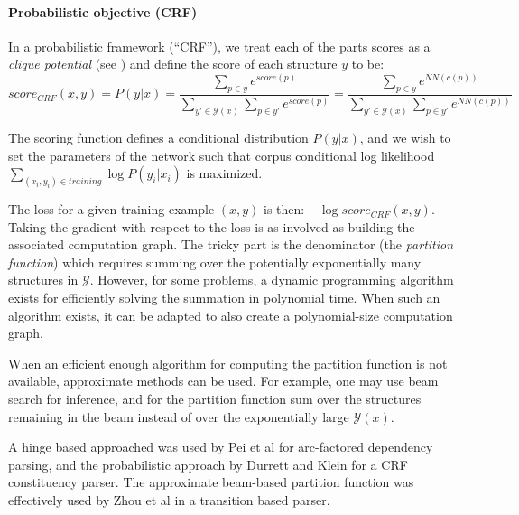 \documentclass[jair,twoside,11pt,theapa]{article}
\renewcommand{\shortcite}[0]{\citeyear}
\begin{document}
{\paragraph{Probabilistic objective (CRF)}

In a probabilistic framework (``CRF''), we treat each of the parts scores as a
\emph{clique potential} (see \cite{smith2011linguistic}) and define the score of each structure $y$ to be:
\[
score_{CRF}(x,y) = P(y|x) = \frac{\sum_{p \in y} e^{score(p)}}{\sum_{y' \in \mathcal{Y}(x)}\sum_{p \in y'}e^{score(p)}} = \frac{\sum_{p \in y} e^{NN(c(p))}}{\sum_{y' \in \mathcal{Y}(x)}\sum_{p \in y'}e^{NN(c(p))}} 
\]

The scoring function defines a conditional distribution $P(y|x)$, and we wish to
set the parameters of the network such that corpus conditional log likelihood
$\sum_{(x_i,y_i) \in training}\log P(y_i|x_i)$ is maximized.

The loss for a given training example $(x,y)$ is then: $-\log score_{CRF}(x,y)$.
Taking the gradient with respect to the loss is as involved as building the
associated computation graph. The tricky part is the denominator (the
\emph{partition function}) which requires summing over the potentially
exponentially many structures in $\mathcal{Y}$. However, for some problems, a
dynamic programming algorithm exists for efficiently solving the summation in
polynomial time. When such an algorithm exists, it can be adapted to also create
a polynomial-size computation graph.

When an efficient enough algorithm for computing the partition function is not
available, approximate methods can be used. For example, one may use beam search
for inference, and for the partition function sum over the structures remaining
in the beam instead of over the exponentially large $\mathcal{Y}(x)$.  

A hinge based approached was used by Pei et al \shortcite{pei2015effective} for 
arc-factored dependency parsing, and the probabilistic approach by Durrett and
Klein \cite{durrett2015neural} for a CRF constituency parser.
The approximate beam-based partition function was effectively used by 
Zhou et al \shortcite{zhou2015neural} in a transition based parser.

}
\end{document}
